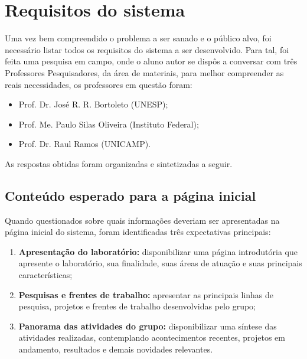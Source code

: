 
\vspace{5mm}
\section{Requisitos do sistema}
\label{sec:Requisitos}


Uma vez bem compreendido o problema a ser sanado e o público alvo, foi necessário listar todos os requisitos do sistema a ser desenvolvido. Para tal, foi feita uma pesquisa em campo, onde o aluno autor se dispôs a conversar com três Professores Pesquisadores, da área de materiais, para melhor compreender as reais necessidades, os professores em questão foram:
\begin{itemize}
	\item Prof. Dr. José R. R. Bortoleto (UNESP);
	\item Prof. Me. Paulo Silas Oliveira (Instituto Federal);
	\item Prof. Dr. Raul Ramos (UNICAMP).
\end{itemize}
As respostas obtidas foram organizadas e sintetizadas a seguir.
\vspace{5mm}
\subsection{Conteúdo esperado para a página inicial}

Quando questionados sobre quais informações deveriam ser apresentadas na página inicial do sistema, foram identificadas três expectativas principais:

\begin{enumerate}
	\item \textbf{Apresentação do laboratório:} disponibilizar uma página introdutória que apresente o laboratório, sua finalidade, suas áreas de atuação e suas principais características;
	
	\item \textbf{Pesquisas e frentes de trabalho:} apresentar as principais linhas de pesquisa, projetos e frentes de trabalho desenvolvidas pelo grupo;
	
	\item \textbf{Panorama das atividades do grupo:} disponibilizar uma síntese das atividades realizadas, contemplando acontecimentos recentes, projetos em andamento, resultados e demais novidades relevantes.
\end{enumerate}


